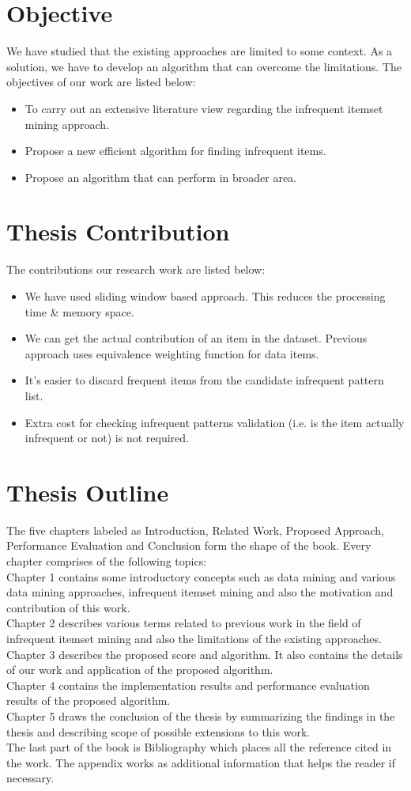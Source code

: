 \section{Objective}
%
We have studied that the existing approaches are limited to some context. As a solution, we have to develop an algorithm that can overcome the limitations. The objectives of our work are listed below:
%
\begin{itemize}
\item To carry out an extensive literature view regarding the infrequent itemset mining approach.
\item Propose a new efficient algorithm for finding infrequent items. 
\item Propose an algorithm that can perform in broader area.
\end{itemize}
%
\section{Thesis Contribution}
%
The contributions our research work are listed below:
%
\begin{itemize}
%
\item We have used sliding window based approach. This reduces the processing time \& memory space.
%
\item We can get the actual contribution of an item in the dataset. Previous approach uses equivalence weighting function for data items.
% 
\item It’s easier to discard frequent items from the candidate infrequent pattern list.
\item Extra cost for checking infrequent patterns validation (i.e. is the item actually infrequent or not) is not required.
%
\end{itemize}
%
\section{Thesis Outline}
The five chapters labeled as Introduction, Related Work, Proposed Approach, Performance Evaluation and Conclusion form the shape of the book.
Every chapter comprises of the following topics: \\
%
Chapter 1 contains some introductory concepts such as data mining and various data mining approaches, infrequent itemset mining and also the motivation and contribution of this work.\\
%
Chapter 2 describes various terms related to previous work in the field of infrequent itemset mining and also the limitations of the existing approaches. \\
%
Chapter 3 describes the proposed score and algorithm. It also contains the details of our work and application of the proposed algorithm. \\
%
Chapter 4 contains the implementation results and performance evaluation results of the proposed algorithm. \\
%
Chapter 5 draws the conclusion of the thesis by summarizing the
findings in the thesis and describing scope of possible extensions to this work. \\
%
The last part of the book is Bibliography which places all the reference cited in the work. The appendix works as additional information that helps the reader if necessary.
%
